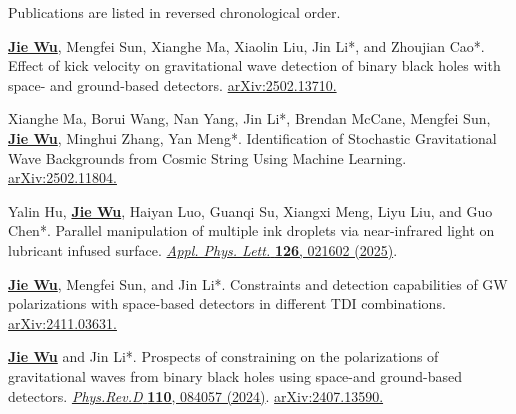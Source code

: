 


\begin{cvparagraph}
    Publications are listed in reversed chronological order.
\end{cvparagraph}

\begin{cvpublications}
\begin{pubitems} 
\item {\textbf{\underline{Jie Wu}}, Mengfei Sun, Xianghe Ma, Xiaolin Liu, Jin Li*, and Zhoujian Cao*. Effect of kick velocity on gravitational wave detection of binary black holes with space- and ground-based detectors. \href{https://arxiv.org/abs/2502.13710}{arXiv:2502.13710.}}

\item {Xianghe Ma, Borui Wang, Nan Yang, Jin Li*, Brendan McCane, Mengfei Sun, \textbf{\underline{Jie Wu}}, Minghui Zhang, Yan Meng*. Identification of Stochastic Gravitational Wave Backgrounds from Cosmic String Using Machine Learning. \href{https://arxiv.org/abs/2502.11804}{arXiv:2502.11804.}}

\item {Yalin Hu, \textbf{\underline{Jie Wu}}, Haiyan Luo, Guanqi Su, Xiangxi Meng, Liyu Liu, and Guo Chen*. Parallel manipulation of multiple ink droplets via near-infrared light on lubricant infused surface. \href{https://pubs.aip.org/aip/apl/article/126/2/021602/3330590}{\textit{Appl. Phys. Lett.} \textbf{126}, 021602 (2025)}.}

\item {\textbf{\underline{Jie Wu}}, Mengfei Sun, and Jin Li*. Constraints and detection capabilities of GW polarizations with space-based detectors in different TDI combinations. \href{https://arxiv.org/abs/2411.03631}{arXiv:2411.03631.}}

\item {\textbf{\underline{Jie Wu}} and Jin Li*. Prospects of constraining on the polarizations of gravitational waves from binary black holes using space-and ground-based detectors. \href{https://journals.aps.org/prd/abstract/10.1103/PhysRevD.110.084057}{\textit{Phys.Rev.D} \textbf{110}, 084057 (2024)}. \href{https://arxiv.org/abs/2407.13590}{arXiv:2407.13590.}}


\end{pubitems}
\end{cvpublications}
